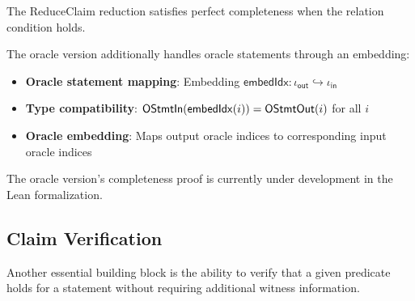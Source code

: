 \begin{theorem}
    The ReduceClaim reduction satisfies perfect completeness when the relation condition holds.
\end{theorem}

\begin{definition}
    \label{def:reduceclaim_oracle_reduction}
    The oracle version additionally handles oracle statements through an embedding:
    \begin{itemize}
        \item \textbf{Oracle statement mapping}: Embedding $\mathsf{embedIdx} : \iota_{\mathsf{out}} \hookrightarrow \iota_{\mathsf{in}}$
        \item \textbf{Type compatibility}: $\mathsf{OStmtIn}(\mathsf{embedIdx}(i)) = \mathsf{OStmtOut}(i)$ for all $i$
        \item \textbf{Oracle embedding}: Maps output oracle indices to corresponding input oracle indices
    \end{itemize}
\end{definition}

\begin{remark}
    The oracle version's completeness proof is currently under development in the Lean formalization.
\end{remark}

\subsection{Claim Verification}

Another essential building block is the ability to verify that a given predicate holds for a statement without requiring additional witness information.

